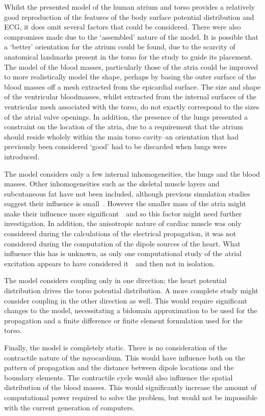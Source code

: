 Whilst the presented model of the human atrium and torso provides a relatively
good reproduction of the features of the body surface potential distribution and
ECG, it does omit several factors that could be considered.
There were also compromises made due to the `assembled' nature of the model.
It is possible that a `better' orientation for the atrium could be found, due to
the scarcity of anatomical landmarks present in the torso for the study to guide
its placement.
The model of the blood masses, particularly those of the atria could be improved
to more realistically model the shape, perhaps by basing the outer surface of
the blood masses off a mesh extracted from the epicardial surface.
The size and shape of the ventricular bloodmasses, whilst extracted from the
internal surfaces of the ventricular mesh associated with the torso, do not
exactly correspond to the sizes of the atrial valve openings.
In addition, the presence of the lungs presented a constraint on the location of
the atria, due to a requirement that the atrium should reside wholely within the
main torso cavity--an orientation that had previously been considered `good' had
to be discarded when lungs were introduced.

The model considers only a few internal inhomogeneities, the lungs and the blood
masses.
Other inhomogeneities such as the skeletal muscle layers and subcutaneous fat
have not been included, although previous simulation studies suggest their
influence is small~\cite{Klepfer1997}.
However the smaller mass of the atria might make their influence more
significant~\cite{vanDam2005}\ and so this factor might need further
investigation.
In addition, the anisotropic nature of cardiac muscle was only considered during
the calculations of the electrical propagation, it was not considered during the
computation of the dipole sources of the heart.
What influence this has is unknown, as only one computational study of the
atrial excitation appears to have considered it~\cite{Seger2004}\ and then not in
isolation.

The model considers coupling only in one direction; the heart potential
distribution drives the torso potential distribution.
A more complete study might consider coupling in the other direction as well.
This would require significant changes to the model, necessitating a bidomain
approximation to be used for the propagation and a finite difference or finite
element formulation used for the torso.

Finally, the model is completely static.
There is no consideration of the contractile nature of the myocardium.
This would have influence both on the pattern of propagation and the distance
between dipole locations and the boundary elements.
The contractile cycle would also influence the spatial distribution of the
blood masses.
This would significantly increase the amount of computational power required to
solve the problem, but would not be impossible with the current generation of
computers.


